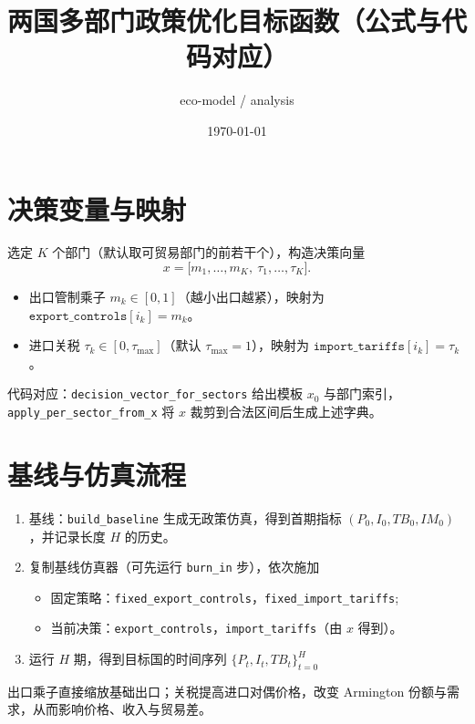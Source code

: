 \documentclass[11pt]{article}
\title{两国多部门政策优化目标函数（公式与代码对应）}
\author{eco-model / analysis}
\date{\today}
\begin{document}
\maketitle

\section{决策变量与映射}
选定 $K$ 个部门（默认取可贸易部门的前若干个），构造决策向量
\[
    x = \big[m_1,\dots,m_K,\ \tau_1,\dots,\tau_K\big].
\]
\begin{itemize}
    \item 出口管制乘子 $m_k \in [0,1]$（越小出口越紧），映射为 $\texttt{export\_controls}[i_k] = m_k$。
    \item 进口关税 $\tau_k \in [0,\tau_{\max}]$（默认 $\tau_{\max}=1$），映射为 $\texttt{import\_tariffs}[i_k] = \tau_k$。
\end{itemize}
代码对应：\verb|decision_vector_for_sectors| 给出模板 $x_0$ 与部门索引，\verb|apply_per_sector_from_x| 将 $x$ 裁剪到合法区间后生成上述字典。

\section{基线与仿真流程}
\begin{enumerate}
    \item 基线：\verb|build_baseline| 生成无政策仿真，得到首期指标 $(P_0, I_0, TB_0, IM_0)$，并记录长度 $H$ 的历史。
    \item 复制基线仿真器（可先运行 \texttt{burn\_in} 步），依次施加
    \begin{itemize}
        \item 固定策略：\verb|fixed_export_controls|，\verb|fixed_import_tariffs|;
        \item 当前决策：\verb|export_controls|，\verb|import_tariffs|（由 $x$ 得到）。
    \end{itemize}
    \item 运行 $H$ 期，得到目标国的时间序列 ${\{P_t, I_t, TB_t\}}_{t=0}^H$
\end{enumerate}
出口乘子直接缩放基础出口；关税提高进口对偶价格，改变 Armington 份额与需求，从而影响价格、收入与贸易差。
\end{document}
